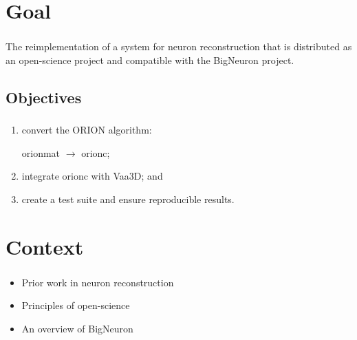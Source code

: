 \documentclass{beamer}
\newcommand{\tbackground}[1]{#1}
\newcommand{\tobjectives}[1]{#1}
\newcommand{\tbackground}[1]{\textcolor{tbackground}{#1}}
\newcommand{\tobjectives}[1]{\textcolor{tobjectives}{#1}}
\begin{document}
\section{Goal}
\begin{frame}\frametitle{\secname}
	\centering
	\tobjectives{%
	The reimplementation of  a system
		for \alert{neuron reconstruction}
		that is distributed as an \alert{open-science} project
		and
		compatible with the \alert{BigNeuron} project.
	}
\end{frame}

\subsection{Objectives}
\begin{frame}\frametitle{\subsecname}
	\tobjectives{%
	\begin{enumerate}[<+->]
		\setlength\itemsep{1em}
		\item convert the ORION algorithm: \faRefresh
			\begin{center}
				\gls{orionmat} $\rightarrow$ \gls{orionc};
			\end{center}
		\item integrate \gls{orionc} with Vaa3D; \faCogs{}
			and %
		\item create a test suite and ensure
			reproducible results. \faCheckSquareO %

	\end{enumerate}
	}
\end{frame}

\section{Context}
\begin{frame}\frametitle{\secname}
	\tbackground{%
	\begin{itemize}
		\item Prior work in \alert{neuron reconstruction}
		\item Principles of \alert{open-science}
		\item An overview of \alert{BigNeuron}
	\end{itemize}
	}
\end{frame}
\end{document}
